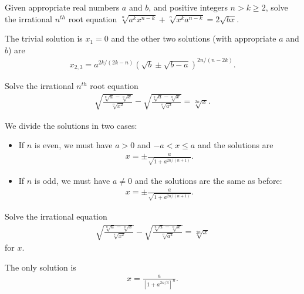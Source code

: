 \documentclass[12pt,a4paper]{memoir}
\theoremstyle{definition}
\begin{document}
\begin{question}\label{p:irrational-K}
	Given appropriate real numbers $a$ and $b$, and positive integers $n>k\geq 2$, solve the irrational $n^{th}$ root equation $\sqrt[n]{a^kx^{n-k}}+\sqrt[n]{x^ka^{n-k}}=2\sqrt{bx}$.
\end{question}

\begin{solution}
	The trivial solution is $x_1=0$ and the other two solutions (with appropriate $a$ and $b$) are
	\begin{align*}
		x_{2,3} = a^{2k/(2k-n)} \left(\sqrt{b}\pm \sqrt{b-a}\right)^{2n/(n-2k)}.
	\end{align*}
\end{solution}


\begin{question}\label{p:irrational-L}
	Solve the irrational $n^{th}$ root equation
	\begin{align*}
		\sqrt{\frac{\sqrt[n]{a}-\sqrt[n]{x}}{\sqrt[n]{x^2}}}-\sqrt{\frac{\sqrt[n]{a}-\sqrt[n]{x}}{\sqrt[n]{a^2}}}=\sqrt[2n]{x}.
	\end{align*}
\end{question}

\begin{solution}
	We divide the solutions in two cases:
	\begin{itemize}
		\item If $n$ is even, we must have $a>0$ and $-a< x \leq a$ and the solutions are
		\begin{align*}
			x=\pm\frac{a}{\sqrt{1+a^{2n/(n+1)}}}.
		\end{align*}
		\item If $n$ is odd, we must have $a \neq 0$ and the solutions are the same as before:
		\begin{align*}
			x=\pm\frac{a}{\sqrt{1+a^{2n/(n+1)}}}.
		\end{align*}
	\end{itemize}
\end{solution}

\begin{question}\label{p:irrational-M}
	Solve the irrational equation 
	\begin{align*}
		\displaystyle \sqrt{\frac{\sqrt[n]{a}-\sqrt[n]{x}}{\sqrt[n]{x^2}}}-\sqrt{\frac{\sqrt[n]{a}-\sqrt[n]{x}}{\sqrt[n]{a^2}}}=\sqrt[2n]{x}
	\end{align*}
	for $x$.
\end{question}

\begin{solution}
	The only solution is
	\begin{align*}
		x=\frac{a}{\left[1+a^{2n/3}\right]^n}.
	\end{align*}
\end{solution}
\end{document}
